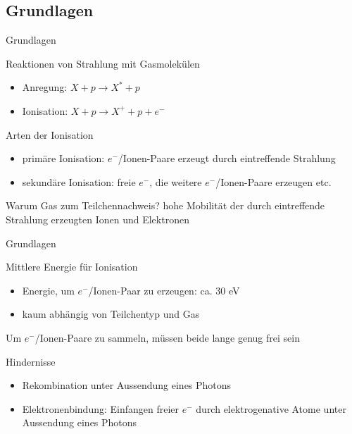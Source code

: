 \subsection{Grundlagen}

\begin{frame}{Grundlagen}
	\begin{block}{Reaktionen von Strahlung mit Gasmolekülen}
		\begin{itemize}
		  \item Anregung:	$X+p\rightarrow X^*+p$\\
		  \item Ionisation:	$X+p\rightarrow X^++p+e^-$\\
		\end{itemize}		
	\end{block}

	\begin{block}{Arten der Ionisation}
		\begin{itemize}
		  \item primäre Ionisation: $e^-$/Ionen-Paare erzeugt durch eintreffende Strahlung
		  \item sekundäre Ionisation: freie $e^-$, die weitere $e^-$/Ionen-Paare erzeugen
		  etc.
		\end{itemize}
	\end{block}	
	
	\begin{block}{Warum Gas zum Teilchennachweis?}
		 hohe Mobilität der durch eintreffende Strahlung erzeugten Ionen und Elektronen
	\end{block}
\end{frame}


\begin{frame}{Grundlagen}
	\begin{block}{Mittlere Energie für Ionisation}
		\begin{itemize}
		  \item Energie, um $e^-$/Ionen-Paar zu erzeugen: ca. 30 eV
		  \item kaum abhängig von Teilchentyp und Gas
		\end{itemize}
	\end{block}
	\vspace*{0.7cm}
	Um $e^-$/Ionen-Paare zu sammeln, müssen beide lange genug frei sein
	\begin{block}{Hindernisse}
			\begin{itemize}
		  \item Rekombination unter Aussendung eines Photons
		  \item Elektronenbindung: Einfangen freier $e^-$ durch elektrogenative Atome unter Aussendung
		  eines Photons
		\end{itemize}
	\end{block}
\end{frame}

